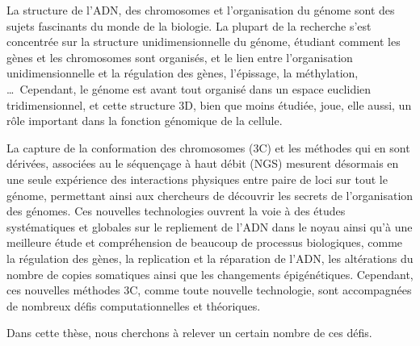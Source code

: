 \begin{resumes}

La structure de l'ADN, des chromosomes et l'organisation du génome sont des
sujets fascinants du monde de la biologie. La plupart de la recherche s'est
concentrée sur la structure unidimensionnelle du génome, étudiant comment les
gènes et les chromosomes sont organisés, et le lien entre l'organisation
unidimensionnelle et la régulation des gènes, l'épissage, la méthylation,
\dots \ Cependant, le génome est avant tout organisé dans un espace euclidien
tridimensionnel, et cette structure 3D, bien que moins étudiée, joue, elle
aussi, un rôle important dans la fonction génomique de la cellule.

La capture de la conformation des chromosomes (3C) et les méthodes qui en sont
dérivées, associées au le séquençage à haut débit (NGS) mesurent désormais
en une seule expérience des interactions physiques entre paire de
loci sur tout le génome, permettant ainsi aux chercheurs de découvrir les
secrets de l'organisation des génomes. Ces nouvelles technologies
ouvrent la voie à des études systématiques et globales sur le repliement de
l'ADN dans le noyau ainsi qu'à une meilleure étude et compréhension de
beaucoup de processus biologiques, comme la régulation des gènes, la replication
et la réparation de l'ADN, les altérations du nombre de copies somatiques ainsi
que les changements épigénétiques. Cependant, ces nouvelles méthodes 3C, comme
toute nouvelle technologie, sont accompagnées de nombreux défis
computationnelles et théoriques.

Dans cette thèse, nous cherchons à relever un certain nombre de ces défis.


\end{resumes}
